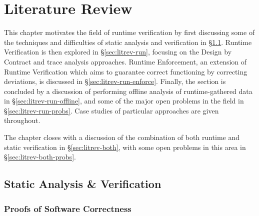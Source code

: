 \chapter{Literature Review}
\label{sec:litrev}


This chapter motivates the field of runtime verification by first
discussing some of the techniques and difficulties of static analysis
and verification in \S\ref{sec:litrev-stat}. Runtime Verification is
then explored in \S\ref{sec:litrev-run}, focusing on the Design by
Contract and trace analysis approaches. Runtime Enforcement, an
extension of Runtime Verification which aims to guarantee correct
functioning by correcting deviations, is discussed in
\S\ref{sec:litrev-run-enforce}. Finally, the section is concluded by a
discussion of performing offline analysis of runtime-gathered data in
\S\ref{sec:litrev-run-offline}, and some of the major open problems in
the field in \S\ref{sec:litrev-run-probs}. Case studies of particular
approaches are given throughout.

The chapter closes with a discussion of the combination of both
runtime and static verification in \S\ref{sec:litrev-both}, with some
open problems in this area in \S\ref{sec:litrev-both-probs}.

\section{Static Analysis \& Verification}
\label{sec:litrev-stat}


\subsection{Proofs of Software Correctness}
\label{sec:litrev-stat-proof}


